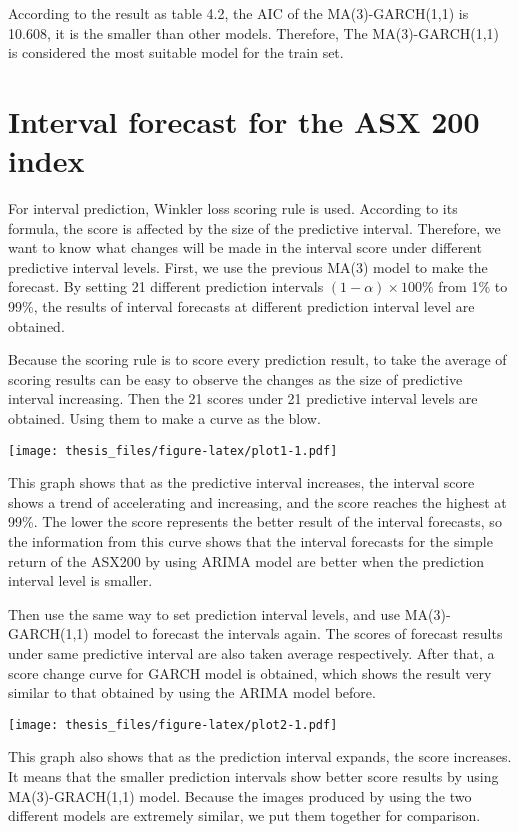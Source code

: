 \documentclass{monashthesis}
\theoremstyle{definition}
\theoremstyle{definition}
\theoremstyle{definition}
\theoremstyle{remark}
\begin{document}
According to the result as table 4.2, the AIC of the MA(3)-GARCH(1,1) is
10.608, it is the smaller than other models. Therefore, The
MA(3)-GARCH(1,1) is considered the most suitable model for the train
set.

\section{Interval forecast for the ASX 200
index}\label{interval-forecast-for-the-asx-200-index}

For interval prediction, Winkler loss scoring rule is used. According to
its formula, the score is affected by the size of the predictive
interval. Therefore, we want to know what changes will be made in the
interval score under different predictive interval levels. First, we use
the previous MA(3) model to make the forecast. By setting 21 different
prediction intervals \((1-\alpha)\times100\%\) from 1\% to 99\%, the
results of interval forecasts at different prediction interval level are
obtained.

Because the scoring rule is to score every prediction result, to take
the average of scoring results can be easy to observe the changes as the
size of predictive interval increasing. Then the 21 scores under 21
predictive interval levels are obtained. Using them to make a curve as
the blow.

\texttt{[image: thesis\_files/figure-latex/plot1-1.pdf]}

This graph shows that as the predictive interval increases, the interval
score shows a trend of accelerating and increasing, and the score
reaches the highest at 99\%. The lower the score represents the better
result of the interval forecasts, so the information from this curve
shows that the interval forecasts for the simple return of the ASX200 by
using ARIMA model are better when the prediction interval level is
smaller.

Then use the same way to set prediction interval levels, and use
MA(3)-GARCH(1,1) model to forecast the intervals again. The scores of
forecast results under same predictive interval are also taken average
respectively. After that, a score change curve for GARCH model is
obtained, which shows the result very similar to that obtained by using
the ARIMA model before.

\texttt{[image: thesis\_files/figure-latex/plot2-1.pdf]}

This graph also shows that as the prediction interval expands, the score
increases. It means that the smaller prediction intervals show better
score results by using MA(3)-GRACH(1,1) model. Because the images
produced by using the two different models are extremely similar, we put
them together for comparison.
\end{document}
